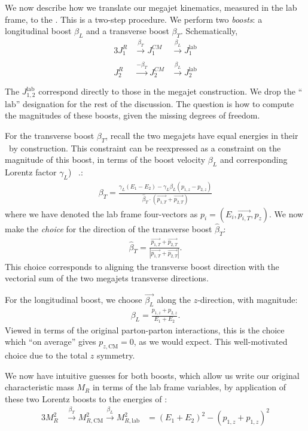 We now describe how we translate our megajet kinematics, measured in the lab frame, to the \rframe.
This is a two-step procedure.
We perform two \textit{boosts}: a longitudinal boost $\beta_L$ and a transverse boost $\beta_T$.
Schematically,
\begin{alignat}{3}
J_1^R & \xrightarrow[]{ \beta_T} J_1^{CM} & \xrightarrow[]{\beta_L} J_1^{\text{lab}} \\
J_2^R & \xrightarrow[]{-\beta_T} J_2^{CM} & \xrightarrow[]{\beta_L} J_2^{\text{lab}} \\
\end{alignat}
The $J_{1,2}^{\text{lab}}$ correspond directly to those in the megajet construction.
We drop the ``$\text{lab}$'' designation for the rest of the discussion.
The question is how to compute the magnitudes of these boosts, given the missing degrees of freedom.

For the transverse boost $\beta_T$, recall the two megajets have equal energies in their \rframe~by construction.
This constraint can be reexpressed as a constraint on the magnitude of this boost, in terms of the boost velocity $\beta_L$ and corresponding Lorentz factor $\gamma_L$) ~\cite{Rogan:2010kb,Buckley:2013kua}.:
\begin{align}\label{eq:beta_t}
\beta_T = \frac{ \gamma_L (E_1 - E_2) - \gamma_L \beta_L (p_{1,z} - p_{2,z})}
               { \hat{\beta}_T \cdot (\vec{p_{1,T}} + \vec{p_{2,T}} )}
\end{align}
where we have denoted the lab frame four-vectors as  $p_i = (E_i , \vec{p_{i,T}} , p_z)$.
We now make the \textit{choice} for the direction of the transverse boost $\hat{\beta}_T$:
\begin{align}
\hat{\beta}_T =  \frac{\vec{p_{1,T}} +  \vec{p_{2,T}}}{ | \vec{p_{1,T}} +  \vec{p_{2,T}}  | }.
\end{align}
This choice corresponds to aligning the transverse boost direction with the vectorial sum of the two megajets transverse directions.

For the longitudinal boost, we choose $\vec{\beta_L}$ along the $z$-direction, with magnitude:
\begin{align} \label{eq:beta_l}
\beta_L = \frac{p_{1,z} + p_{2,z}}{E_1+E_2}.
\end{align}
Viewed in terms of the original parton-parton interactions, this is the choice which ``on average'' gives $p_{z,\text{CM}} = 0$, as we would expect.
This well-motivated choice due to the total $z$ symmetry.

We now have intuitive guesses for both boosts, which allow us write our original characteristic mass $M_R$ in terms of the lab frame variables, by application of these two Lorentz boosts to the energies of :
\begin{alignat}{3}
M_R^2 &\xrightarrow[]{\beta_T } M_{R,\text{CM}}^{2} \xrightarrow[]{\beta_L } M_{R,\text{lab}}^{2}
      &=(E_1 + E_2)^2 - (p_{1,z} + p_{1,z})^2
\end{alignat}

